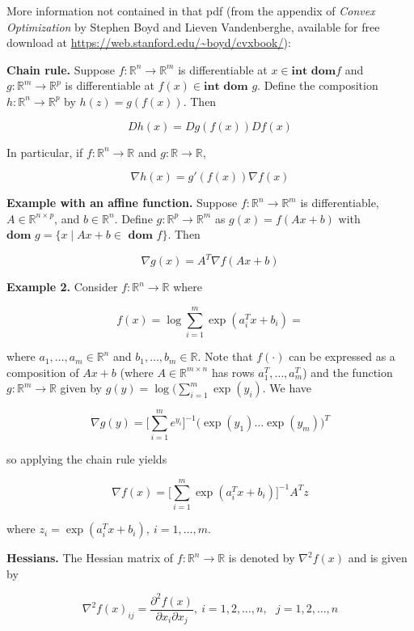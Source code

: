 More information not contained in that pdf (from the appendix of \textit{Convex Optimization} by Stephen Boyd and Lieven Vandenberghe, available for free download at \url{https://web.stanford.edu/~boyd/cvxbook/}):

\textbf{Chain rule.} Suppose \(f: \mathbb{R}^n \to \mathbb{R}^m\) is differentiable at \(x \in \textbf{int} \textbf{ dom} f\) and  \(g: \mathbb{R}^m \to \mathbb{R}^p\) is differentiable at \(f(x) \in \textbf{int} \textbf{ dom } g\). Define the composition \(h: \mathbb{R}^n \to \mathbb{R}^p\) by \(h(z) =  g(f(x))\). Then

\[
D h(x) = Dg(f(x)) D f(x)
\]

In particular, if \(f: \mathbb{R}^n \to \mathbb{R}\) and  \(g: \mathbb{R} \to \mathbb{R}\),

\[
\nabla h(x) = g'(f(x)) \nabla f(x)
\]

\textbf{Example with an affine function.} Suppose \(f: \mathbb{R}^n \to \mathbb{R}^m\) is differentiable, \(A \in \mathbb{R}^{n \times p}\), and \(b \in \mathbb{R}^n\). Define \(g: \mathbb{R}^p \to \mathbb{R}^m\) as \(g(x) = f(Ax + b)\) with \(\textbf{dom } g = \{x \mid Ax + b \in \textbf{ dom } f \}\). Then 

\[
\nabla g(x) = A^T \nabla f(Ax + b)
\]

\textbf{Example 2.} Consider \(f: \mathbb{R}^n \to \mathbb{R}\) where 

\[
f(x) = \log \sum_{i=1}^m \exp(a_i^Tx + b_i) = 
\]

where \(a_1, \ldots, a_m \in \mathbb{R}^n\)  and \(b_1, \ldots, b_m \in \mathbb{R}\). Note that \(f(\cdot)\) can be expressed as a composition of \(Ax + b\) (where \(A \in \mathbb{R}^{m \times n}\) has rows \(a_1^T , \ldots, a_m^T\)) and the function \(g: \mathbb{R}^m \to \mathbb{R}\) given by \(g(y) = \log( \sum_{i=1}^m \exp(y_i)\). We have

\[
\nabla g(y) = \bigg[ \sum_{i=1}^m e^{y_i} \bigg]^{-1} \big( \exp(y_1) \ldots \exp(y_m) \big) ^T
\]

so applying the chain rule yields

\[
\nabla f(x) =  \bigg[ \sum_{i=1}^m \exp( a_i^T x + b_i) \bigg]^{-1} A^T z
\]

where \(z_i = \exp(a_i^T x + b_i), \ i =1 , \ldots, m\).

\textbf{Hessians.} The Hessian matrix of \(f: \mathbb{R}^n \to \mathbb{R}\) is denoted by \(\nabla^2f(x)\) and is given by

\[
\nabla^2 f(x)_{ij} = \frac{\partial^2 f(x)}{\partial x_i \partial x_j} , \ i = 1, 2, \ldots, n, \ \ \ j = 1, 2, \ldots, n
\]

